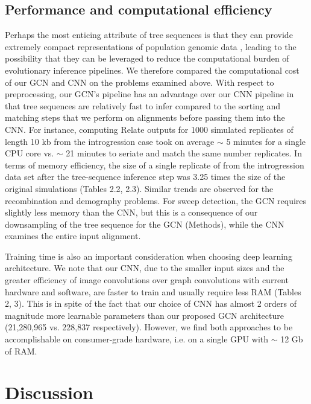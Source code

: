 \subsection{Performance and computational efficiency}
Perhaps the most enticing attribute of tree sequences is that they can provide extremely compact representations of population genomic data \cite{kelleherInferringWholegenomeHistories2019}, leading to the possibility that they can be leveraged to reduce the computational burden of evolutionary inference pipelines. We therefore compared the computational cost of our GCN and CNN on the problems examined above. With respect to preprocessing, our GCN's pipeline has an advantage over our CNN pipeline in that tree sequences are relatively fast to infer compared to the sorting and matching steps that we perform on alignments before passing them into the CNN. For instance, computing Relate outputs for 1000 simulated replicates of length 10 kb from the introgression case took on average $\sim$ 5 minutes for a single CPU core vs. $\sim$ 21 minutes to seriate and match the same number replicates. In terms of memory efficiency, the size of a single replicate of from the introgression data set after the tree-sequence inference step was 3.25 times the size of the original simulations (Tables 2.2, 2.3). Similar trends are observed for the recombination and demography problems. For sweep detection, the GCN requires slightly less memory than the CNN, but this is a consequence of our downsampling of the tree sequence for the GCN (Methods), while the CNN examines the entire input alignment. 

Training time is also an important consideration when choosing deep learning architecture. We note that our CNN, due to the smaller input sizes and the greater efficiency of image convolutions over graph convolutions with current hardware and software, are faster to train and usually require less RAM (Tables 2, 3). This is in spite of the fact that our choice of CNN has almost 2 orders of magnitude more learnable parameters than our proposed GCN architecture (21,280,965 vs. 228,837 respectively). However, we find both approaches to be accomplishable on consumer-grade hardware, i.e. on a single GPU with $\sim$ 12 Gb of RAM. 






\section{Discussion}

